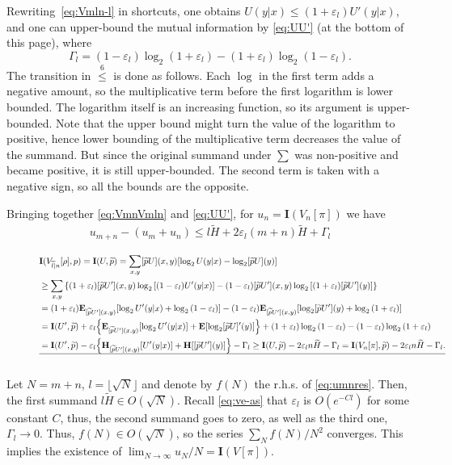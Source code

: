 \documentclass[journal, twocol]{IEEEtran}
\newcommand{\tl}{{\widetilde{l}}}
\newcommand{\tp}{{\widetilde{p}}}
\newcommand{\bfE}{{\mathbf{E}}}
\newcommand{\bfH}{{\mathbf{H}}}
\newcommand{\tH}{{\widetilde{H}}}
\newcommand{\bfI}{{\mathbf{I}}}
\newcommand{\set}[1]{{\left\{{#1}\right\}}}
\newcommand{\br}[1]{{\left({#1}\right)}}
\newcommand{\brsq}[1]{{\left[{#1}\right]}}
\newcommand{\floor}[1]{\lfloor{{#1}\rfloor}}
\newcommand{\ve}{\varepsilon}
\newcommand{\pW}[2]{[{#1}{#2}]}
\newcommand{\pWd}[2]{[{#1}{#2}]}
\newcommand{\pWyd}[2]{[{#1}{#2}]}
\begin{document}
Rewriting~\eqref{eq:Vmln-l} in shortcuts, one obtains $U(y|x)\leq (1+\ve_l)U'(y|x)$, and one can upper-bound the mutual information by \eqref{eq:UU'} (at the bottom of this page), where $$\Gamma_l=(1-\ve_l)\log_2(1+\ve_l)-(1+\ve_l)\log_2(1-\ve_l).$$%
The transition in $\stackrel{6}{\leq}$ is done as follows.
Each $\log$ in the first term adds a negative amount, so the multiplicative term before the first logarithm is lower bounded.
The logarithm itself is an increasing function, so its argument is upper-bounded.
Note that the upper bound might turn the value of the logarithm to positive, hence lower bounding of the multiplicative term decreases the value of the summand.
But since the original summand under $\sum$ was non-positive and became positive, it is still upper-bounded.
The second term is taken with a negative sign, so all the bounds are the opposite.

Bringing together \eqref{eq:VmnVmln} and \eqref{eq:UU'}, for $u_n=\bfI(V_n[\pi])$ we have
\begin{align}
u_{m+n}-(u_m+u_n) \leq l\tH+2\ve_l(m+n)\tH+\Gamma_l
\label{eq:umnres}
\end{align}
\begin{figure}[t]
\vspace{-15pt}
\begin{align}
&\bfI(V_{\tl|n}[\rho],p)=\bfI(U,\tp) 
=
\sum_{x,y}\pWd{\tp}{U}(x,y) \brsq{
\log_2 U(y|x)-\log_2 \pWyd{\tp}{U}(y)
}
\nonumber \\&\geq
\sum_{x,y}\set{
(1+\ve_l)\pWd{\tp}{U'}(x,y) \log_2 \brsq{(1-\ve_l) U'(y|x)}
-(1-\ve_l)\pWd{\tp}{U'}(x,y) \log_2 \brsq{(1+\ve_l) \pWyd{\tp}{U'}(y)}
}
\nonumber \\&=
(1+\ve_l)\bfE_{\pW{\tp}{U'}(x,y)}\brsq{\log_2 U'(y|x) + \log_2\br{1-\ve_l}}
-(1-\ve_l)\bfE_{\pW{\tp}{U'}(x,y)}
\brsq{\log_2 \pWyd{\tp}{U'}(y) + \log_2\br{1+\ve_l}}
\nonumber \\&=
\bfI(U',\tp)
+\ve_l\set{\bfE_{\pW{\tp}{U'}(x,y)}\brsq{\log_2 U'(y|x)}+ \bfE\brsq{\log_2 \pWyd{\tp}{U}'(y)}}
+(1+\ve_l)\log_2\br{1-\ve_l}-(1-\ve_l)\log_2\br{1+\ve_l}
\nonumber \\&
=
\bfI(U',\tp)
- \ve_l \set{\bfH_{\pW{\tp}{U'}(x,y)}\brsq{U'(y|x)}+ \bfH\brsq{\pWyd{\tp}{U'}(y)}}
- \Gamma_l
\geq 
\bfI(U,\tp) - 2\ve_ln\tH-\Gamma_l
=
\bfI(V_n[\pi],\tp) - 2\ve_ln\tH-\Gamma_l.
\label{eq:ii}
\\
\hline \nonumber
\end{align}
\end{figure}%
Let $N=m+n$, $l=\floor{\sqrt{N}}$ and denote by $f(N)$ the r.h.s. of \eqref{eq:umnres}.
Then, the first summand $l\tH \in O(\sqrt{N})$.
Recall \eqref{eq:ve-as} that $\ve_l$ is $O(e^{-Cl})$ for some constant $C$, thus, the second summand goes to zero, as well as the third one, $\Gamma_l\to 0$.
Thus, $f(N)\in O(\sqrt{N})$, so the series $\sum_{N} f(N)/N^2$ converges.
This implies the existence of $\lim_{N\to\infty}u_N/N=\bfI(V[\pi])$.
\end{document}
